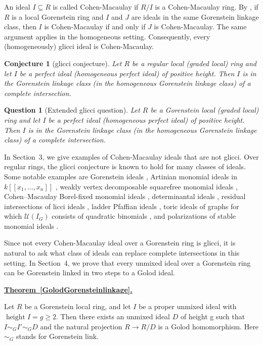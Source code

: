 \documentclass[11pt,letterpaper]{amsart}
\newcommand{\seq}{\subseteq}
\newcommand{\x}{\xrightarrow{}}
\DeclareMathOperator{\height}{height}
\theoremstyle{plain}
\newtheorem{conjecture}[thm]{Conjecture}
\newtheorem{question}[thm]{Question}
\theoremstyle{definition}
\theoremstyle{remark}
\newenvironment{recalledtheorem}[1]
{%
  \par\vspace{7pt}
  \noindent
  \textbf{\hyperref[#1]{Theorem~\ref*{#1}.}}
  \ \itshape
}
{%
  \par\vspace{7pt}
}
\begin{document}
An ideal $I\seq R$ is called Cohen-Macaulay if $R/I$ is a Cohen-Macaulay ring. By \cite[Corollary~3.3]{schenzel1982notes}, if $R$ is a local Gorenstein ring and  $I$ and $J$ are
ideals in the same Gorenstein linkage class, then $I$ is Cohen-Macaulay if and only if $J$ is Cohen-Macaulay. The same argument applies in the homogeneous setting. Consequently, every (homogeneously) glicci ideal is Cohen-Macaulay.

\begin{conjecture}[glicci conjecture]\label{glicciconjecture}
     Let $R$ be a regular local (graded local) ring and let $I$ be a perfect ideal (homogeneous perfect ideal) of positive height. Then $I$ is in the Gorenstein linkage class (in the homogeneous Gorenstein linkage class) of a complete intersection.
\end{conjecture}
\begin{question}[Extended glicci question]\label{extendedglicciquestion}Let $R$ be a Gorenstein local (graded local) ring and let $I$ be a perfect ideal (homogeneous perfect ideal) of positive height. Then $I$ is in the  Gorenstein linkage class (in the homogeneous Gorenstein linkage class) of a complete intersection.  
\end{question} 
In Section~3, we give examples of Cohen-Macaulay ideals that are not glicci.  Over regular rings, the glicci conjecture is known to hold for many classes of ideals. Some notable examples are Gorenstein ideals \cite[Proposition~7.1]{CasanellasDrozdHartshorne+2005+149+171}, Artinian monomial ideals in $k[[x_1,\ldots,x_n]]$ \cite[Theorem~4.2]{huneke2007liaison}, weakly vertex decomposable squarefree monomial ideals \cite[Theorem~3.3]{nagel2008glicci}, Cohen--Macaulay Borel-fixed monomial ideals \cite[Theorem~3.3]{migliore2002monomial}, determinantal ideals \cite[Corollary~3.2]{gorla2008generalized}, residual intersections of licci ideals \cite[Theorem~4.2]{hartshorne2012residual}, ladder Pfaffian ideals \cite[Corollary~2.4]{de2009g}, toric ideals of graphs for which $\mathcal U(I_G)$ consists of quadratic binomials \cite[Theorem~6.11]{cummings2023geometric}, and polarizations of stable monomial ideals \cite[Theorem~3.15]{faridi2025polarization}.

Since not every Cohen-Macaulay ideal over a Gorenstein ring is glicci, it is natural to ask what class of ideals can replace complete intersections in this setting. In Section~4, we prove that every unmixed ideal over a Gorenstein ring can be Gorenstein linked in two steps to a Golod ideal. 
\begin{recalledtheorem}{GolodGorensteinlinkage}
    Let $R$ be a Gorenstein local ring, and let $I$ be a proper unmixed ideal with $\height I=g\ge 2$. Then there exists an unmixed ideal $D$ of height g such that $I\sim_G I'\sim_G D$ and the natural projection $R\x R/D$ is a Golod homomorphism. Here $\sim_G$ stands for Gorenstein link.     
\end{recalledtheorem}
\end{document}
